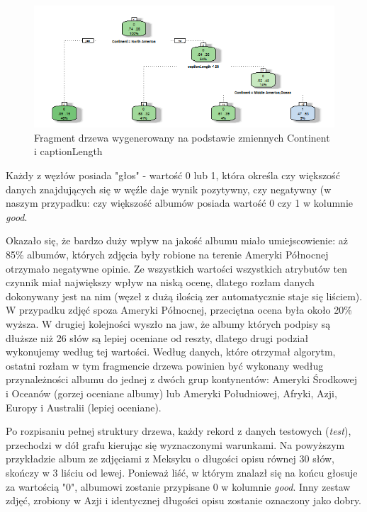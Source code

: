 \documentclass[a4paper,twoside]{article}
\begin{document}
\newpage

\begin{figure}[h!]
	\centering
	\includegraphics[width=1\textwidth]{./img/Rplot01.png}
	\caption{Fragment drzewa wygenerowany na podstawie zmiennych Continent i captionLength}
\end{figure}

Każdy z węzłów posiada "głos" - wartość 0 lub 1, która określa czy większość danych znajdujących się w węźle daje wynik pozytywny, czy negatywny (w naszym przypadku: czy większość albumów posiada wartość 0 czy 1 w kolumnie \textit{good}. 

Okazało się, że bardzo duży wpływ na jakość albumu miało umiejscowienie: aż 85\% albumów, których zdjęcia były robione na terenie Ameryki Północnej otrzymało negatywne opinie. Ze wszystkich wartości wszystkich atrybutów ten czynnik miał największy wpływ na niską ocenę, dlatego rozłam danych dokonywany jest na nim (węzeł z dużą ilością zer automatycznie staje się liściem). W przypadku zdjęć spoza Ameryki Północnej, przeciętna ocena była około 20\% wyższa. W drugiej kolejności wyszło na jaw, że albumy których podpisy są dłuższe niż 26 słów są lepiej oceniane od reszty, dlatego drugi podział wykonujemy według tej wartości. Według danych, które otrzymał algorytm, ostatni rozłam w tym fragmencie drzewa powinien być wykonany według przynależności albumu do jednej z dwóch grup kontynentów: Ameryki Środkowej i Oceanów (gorzej oceniane albumy) lub Ameryki Południowej, Afryki, Azji, Europy i Australii (lepiej oceniane).

Po rozpisaniu pełnej struktury drzewa, każdy rekord z danych testowych (\textit{test}), przechodzi w dół grafu kierując się wyznaczonymi warunkami. Na powyższym przykładzie album ze zdjęciami z Meksyku o długości opisu równej 30 słów, skończy w 3 liściu od lewej. Ponieważ liść, w którym znalazł się na końcu głosuje za wartością "0", albumowi zostanie przypisane 0 w kolumnie \textit{good}. Inny zestaw zdjęć, zrobiony w Azji i identycznej długości opisu zostanie oznaczony jako dobry. \\
\end{document}
